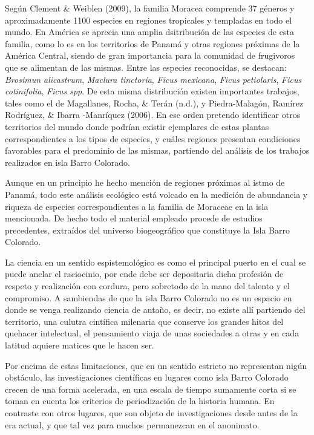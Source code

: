 \documentclass[11pt,]{article}
\begin{document}
Según Clement \& Weiblen (2009), la familia Moracea comprende 37 géneros
y aproximadamente 1100 especies en regiones tropicales y templadas en
todo el mundo. En América se aprecia una amplia dsitribución de las
especies de esta familia, como lo es en los territorios de Panamá y
otras regiones próximas de la América Central, siendo de gran
importancia para la comunidad de frugivoros que se alimentan de las
mismas. Entre las especies reconocidas, se destacan: \emph{Brosimun
alicastrum}, \emph{Maclura tinctoria}, \emph{Ficus mexicana},
\emph{Ficus petiolaris}, \emph{Ficus cotinifolia}, \emph{Ficus spp}. De
esta misma distribución existen importantes trabajos, tales como el de
Magallanes, Rocha, \& Terán (n.d.), y Piedra-Malagón, Ramírez Rodríguez,
\& Ibarra -Manríquez (2006). En ese orden pretendo identificar otros
territorios del mundo donde podrían existir ejemplares de estas plantas
correspondientes a los tipos de especies, y cuáles regiones presentan
condiciones favorables para el predominio de las mismas, partiendo del
análisis de los trabajos realizados en isla Barro Colorado.

Aunque en un principio he hecho mención de regiones próximas al istmo de
Panamá, todo este análisis ecológico está volcado en la medición de
abundancia y riqueza de especies correspondientes a la familia de
Moraceae en la isla mencionada. De hecho todo el material empleado
procede de estudios precedentes, extraídos del universo biogeográfico
que constituye la Isla Barro Colorado.

La ciencia en un sentido espistemológico es como el principal puerto en
el cual se puede anclar el raciocinio, por ende debe ser depositaria
dicha profesión de respeto y realización con cordura, pero sobretodo de
la mano del talento y el compromiso. A sambiendas de que la isla Barro
Colorado no es un espacio en donde se venga realizando ciencia de
antaño, es decir, no existe allí partiendo del territorio, una culutra
cintífica milenaria que conserve los grandes hitos del quehacer
intelectual, el pensamiento viaja de unas sociedades a otras y en cada
latitud aquiere matices que le hacen ser.

Por encima de estas limitaciones, que en un sentido estricto no
representan nigún obstáculo, las investigaciones científicas en lugares
como isla Barro Colorado crecen de una forma acelerada, en una escala de
tiempo sumamente corta si se toman en cuenta los criterios de
periodización de la historia humana. En contraste con otros lugares, que
son objeto de investigaciones desde antes de la era actual, y que tal
vez para muchos permanezcan en el anonimato.
\end{document}
